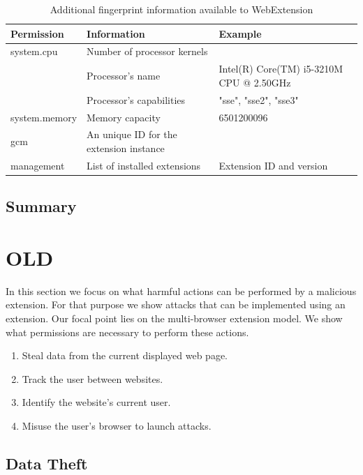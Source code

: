 		\begin{table}[h]
			\begin{tabular}{|l|l|l|} \hline
				\textbf{Permission} & \textbf{Information} & \textbf{Example} \\ \hline
				system.cpu & Number of processor kernels & \\
				& Processor's name & Intel(R) Core(TM) i5-3210M CPU @ 2.50GHz \\
				& Processor's capabilities & "sse", "sse2", "sse3"  \\ \hline
				system.memory & Memory capacity & 6501200096 \\ \hline
				gcm & An unique ID for the extension instance & \\ \hline
				management & List of installed extensions & Extension ID and version \\ \hline
			\end{tabular}
			\caption{Additional fingerprint information available to WebExtension}
			\label{fingerprintExtension}
		\end{table} 

	\subsection{Summary}
	


\section{OLD}

In this section we focus on what harmful actions can be performed by a malicious extension. For that purpose we show attacks that can be implemented using an extension. Our focal point lies on the multi-browser extension model. We show what permissions are necessary to perform these actions. \\ 

\begin{enumerate}
	\item Steal data from the current displayed web page.
	\item Track the user between websites.
	\item Identify the website's current user. 
	\item Misuse the user's browser to launch attacks.
\end{enumerate} 

\subsection{Data Theft}	

